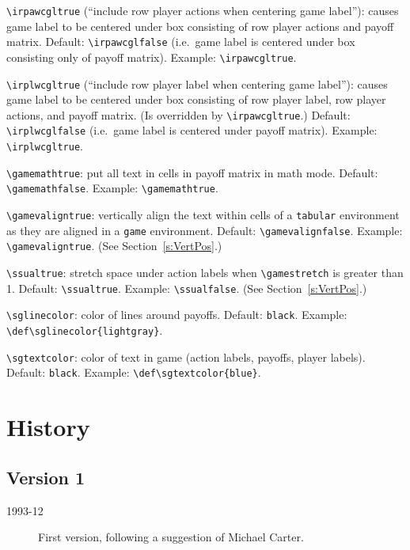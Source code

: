 \documentclass[12pt]{article}
\begin{document}
{\noindent\verb+\irpawcgltrue+ (``include row player actions when centering
game label''): causes game label to be centered under box consisting of row
player actions and payoff matrix.  Default: \verb+\irpawcglfalse+ (i.e.\ game
label is centered under box consisting only of payoff matrix).   Example:
\verb+\irpawcgltrue+.

\vspace{4mm}

\noindent\verb+\irplwcgltrue+ (``include row player label when centering game
label''): causes game label to be centered under box consisting of row player
label, row player actions, and payoff matrix.  (Is overridden by
\verb+\irpawcgltrue+.)  Default: \verb+\irplwcglfalse+ (i.e.\ game label is
centered under payoff matrix).   Example: \verb+\irplwcgltrue+.

\vspace{4mm}

\noindent\verb+\gamemathtrue+: put all text in cells in payoff matrix in math
mode.  Default: \verb+\gamemathfalse+.  Example: \verb+\gamemathtrue+.

\vspace{4mm}

\noindent\verb+\gamevaligntrue+: vertically align the text within cells of a
\verb+tabular+ environment as they are aligned in a \verb+game+ environment. 
Default: \verb+\gamevalignfalse+.  Example: \verb+\gamevaligntrue+.  (See
Section~\ref{s:VertPos}.)

\vspace{4mm}

\noindent\verb+\ssualtrue+: stretch space under action labels when
\verb+\gamestretch+ is greater than 1.  Default: \verb+\ssualtrue+.  Example:
\verb+\ssualfalse+.  (See Section~\ref{s:VertPos}.)

\vspace{4mm}

\noindent\verb+\sglinecolor+: color of lines around payoffs.  Default:
\verb+black+.  Example: \verb+\def\sglinecolor{lightgray}+.

\vspace{4mm}

\noindent\verb+\sgtextcolor+: color of text in game (action labels, payoffs,
player labels).  Default: \verb+black+.  Example:
\verb+\def\sgtextcolor{blue}+.
\section{History}
\subsection*{Version 1}
\begin{description}
\item[1993-12] First version, following a suggestion of Michael Carter.
\end{description}
}
\end{document}
